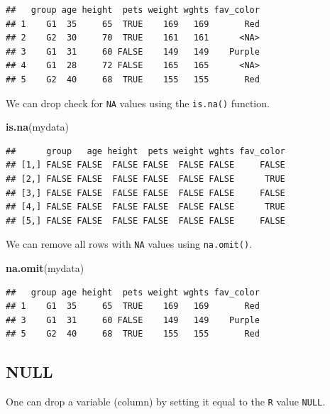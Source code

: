 \documentclass[
]{book}
\newenvironment{Shaded}{\begin{snugshade}}{\end{snugshade}}
\newcommand{\KeywordTok}[1]{\textcolor[rgb]{0.13,0.29,0.53}{\textbf{#1}}}
\newcommand{\NormalTok}[1]{#1}
\newcommand{\OperatorTok}[1]{\textcolor[rgb]{0.81,0.36,0.00}{\textbf{#1}}}
\newcommand{\OtherTok}[1]{\textcolor[rgb]{0.56,0.35,0.01}{#1}}
\newcommand{\StringTok}[1]{\textcolor[rgb]{0.31,0.60,0.02}{#1}}
\begin{document}
\begin{verbatim}
##   group age height  pets weight wghts fav_color
## 1    G1  35     65  TRUE    169   169       Red
## 2    G2  30     70  TRUE    161   161      <NA>
## 3    G1  31     60 FALSE    149   149    Purple
## 4    G1  28     72 FALSE    165   165      <NA>
## 5    G2  40     68  TRUE    155   155       Red
\end{verbatim}

We can drop check for \texttt{NA} values using the \texttt{is.na()} function.

\begin{Shaded}
\begin{Highlighting}[]
\KeywordTok{is.na}\NormalTok{(mydata)}
\end{Highlighting}
\end{Shaded}

\begin{verbatim}
##      group   age height  pets weight wghts fav_color
## [1,] FALSE FALSE  FALSE FALSE  FALSE FALSE     FALSE
## [2,] FALSE FALSE  FALSE FALSE  FALSE FALSE      TRUE
## [3,] FALSE FALSE  FALSE FALSE  FALSE FALSE     FALSE
## [4,] FALSE FALSE  FALSE FALSE  FALSE FALSE      TRUE
## [5,] FALSE FALSE  FALSE FALSE  FALSE FALSE     FALSE
\end{verbatim}

We can remove all rows with \texttt{NA} values using \texttt{na.omit()}.

\begin{Shaded}
\begin{Highlighting}[]
\KeywordTok{na.omit}\NormalTok{(mydata)}
\end{Highlighting}
\end{Shaded}

\begin{verbatim}
##   group age height  pets weight wghts fav_color
## 1    G1  35     65  TRUE    169   169       Red
## 3    G1  31     60 FALSE    149   149    Purple
## 5    G2  40     68  TRUE    155   155       Red
\end{verbatim}

\hypertarget{null}{%
\subsection*{NULL}\label{null}}

One can drop a variable (column) by setting it equal to the \texttt{R} value \texttt{NULL}.

\begin{Shaded}
\end{Shaded}
\end{document}
